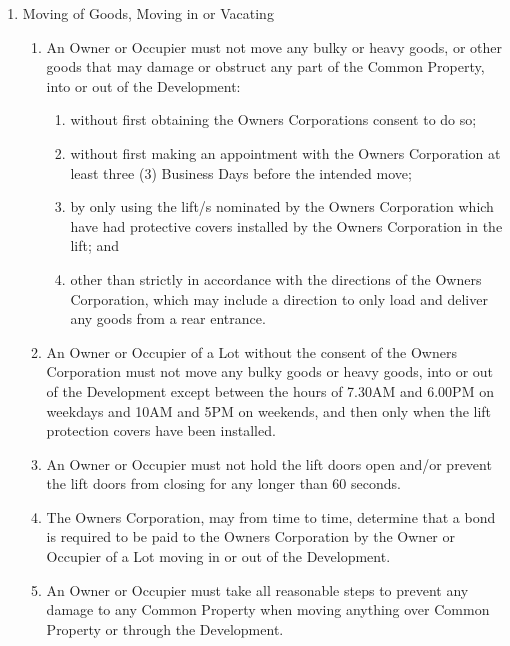 \documentclass{article}
\begin{document}
\begin{enumerate}[label=\arabic*.]
\begin{enumerate}[label=\arabic{enumi}.\arabic*.]
\item  Moving of Goods, Moving in or Vacating

\begin{enumerate}[label=(\arabic*)]

\item  An Owner or Occupier must not move any bulky or heavy goods, or other goods that may damage or obstruct any part of the Common Property, into or out of the Development:

\begin{enumerate}[label=(\alph*)]

\item  without first obtaining the Owners Corporations consent to do so;

\item  without first making an appointment with the Owners Corporation at least three (3) Business Days before the intended move;

\item  by only using the lift/s nominated by the Owners Corporation which have had protective covers installed by the Owners Corporation in the lift; and

\item  other than strictly in accordance with the directions of the Owners Corporation, which may include a direction to only load and deliver any goods from a rear entrance.

\end{enumerate}

\item  An Owner or Occupier of a Lot without the consent of the Owners Corporation must not move any bulky goods or heavy goods, into or out of the Development except between the hours of 7.30AM and 6.00PM on weekdays and 10AM and 5PM on weekends, and then only when the lift protection covers have been installed.

\item  An Owner or Occupier must not hold the lift doors open and/or prevent the lift doors from closing for any longer than 60 seconds.

\item  The Owners Corporation, may from time to time, determine that a bond is required to be paid to the Owners Corporation by the Owner or Occupier of a Lot moving in or out of the Development.

\item  An Owner or Occupier must take all reasonable steps to prevent any damage to any Common Property when moving anything over Common Property or through the Development.


\end{enumerate}
\end{enumerate}
\end{enumerate}
\end{document}
